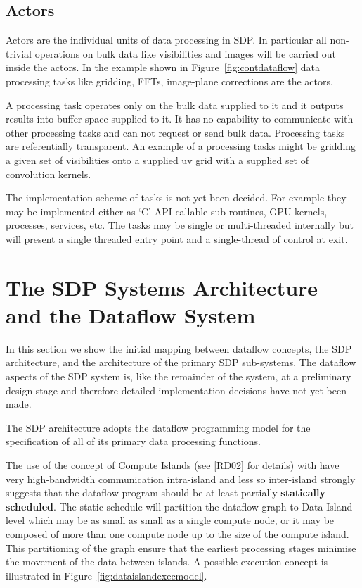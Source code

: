 \documentclass[11pt,a4paper]{article}
\begin{document}
\subsection{Actors}
Actors are the individual units of data processing in SDP. In
particular all non-trivial operations on bulk data like visibilities
and images will be carried out inside the actors. In the example shown
in Figure~\ref{fig:contdataflow} data processing tasks like gridding,
FFTs, image-plane corrections are the actors.

A processing task operates only on the bulk data supplied to it and it
outputs results into buffer space supplied to it. It has no capability
to communicate with other processing tasks and can not request or send
bulk data. Processing tasks are referentially transparent. An example
of a processing tasks might be gridding a given set of visibilities
onto a supplied uv grid with a supplied set of convolution kernels.

The implementation scheme of tasks is not yet been decided. For
example they may be implemented either as ‘C’-API callable
sub-routines, GPU kernels, processes, services, etc. The tasks may be
single or multi-threaded internally but will present a single threaded
entry point and a single-thread of control at exit.

\section{The SDP Systems Architecture and the Dataflow System}
\label{sec:sdp-syst-arch}

In this section we show the initial mapping between dataflow concepts,
the SDP architecture, and the architecture of the primary SDP
sub-systems. The dataflow aspects of the SDP system is, like the
remainder of the system, at a preliminary design stage and therefore
detailed implementation decisions have not yet been made.

The SDP architecture adopts the dataflow programming model for the
specification of all of its primary data processing functions. 

The use of the concept of Compute Islands (see [RD02] for details)
with have very high-bandwidth communication intra-island and less so
inter-island strongly suggests that the dataflow program should be at
least partially {\bf statically scheduled}.  The static schedule will
partition the dataflow graph to Data Island level which may be as
small as small as a single compute node, or it may be composed of more
than one compute node up to the size of the compute island. This
partitioning of the graph ensure that the earliest processing stages
minimise the movement of the data between islands. A possible
execution concept is illustrated in
Figure~\ref{fig:dataislandexecmodel}.
\end{document}
